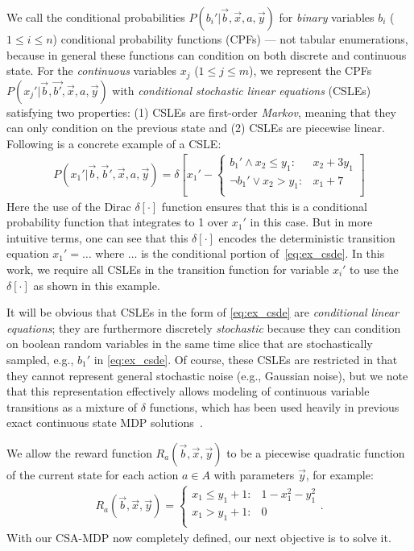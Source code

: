 \documentclass[letterpaper]{article}
\begin{document}
We call the conditional probabilities
$P(b_i'|\vec{b},\vec{x},a,\vec{y})$ for \emph{binary} variables $b_i$
($1 \leq i \leq n$) conditional probability functions (CPFs) --- not
tabular enumerations, because in general these functions can condition
on both discrete and continuous state.  For the \emph{continuous}
variables $x_j$ ($1 \leq j \leq m$), we represent the CPFs
$P(x_j'|\vec{b},\vec{b'},\vec{x},a,\vec{y})$ with \emph{conditional
stochastic linear equations} (CSLEs) satisfying two properties: (1) CSLEs are
first-order \emph{Markov}, meaning that they can only condition on the previous
state and (2) CSLEs are piecewise linear.  Following is 
a concrete example of a CSLE:
{\footnotesize
\begin{align}
P(x_1' | \vec{b},\vec{b}',\vec{x},a,\vec{y}) = \delta\left[ x_1' - 
\begin{cases}
b_1' \land x_2 \leq y_1  : & x_2 + 3y_1 \\
\neg b_1' \lor x_2 > y_1 : & x_1 + 7\\
\end{cases}
\right] \label{eq:ex_csde}
\end{align}}
Here 
the use of the Dirac $\delta[\cdot]$ function ensures that this is a
conditional probability function that integrates to 1 over $x_1'$
in this case.  But in more intuitive terms, one can see that this
$\delta[\cdot]$ encodes the deterministic transition 
equation $x_1' = \ldots$ where $\ldots$ is the conditional portion 
of~\eqref{eq:ex_csde}.
In this work, we require all CSLEs in the transition
function for variable $x_i'$ to use the $\delta[\cdot]$ as shown in this
example.

It will be obvious that CSLEs in the form of \eqref{eq:ex_csde} are
\emph{conditional linear equations}; they are furthermore discretely 
\emph{stochastic}
because they can condition on boolean random variables in the same time slice
that are stochastically sampled, e.g., $b_1'$ in
\eqref{eq:ex_csde}.  Of course, these CSLEs are restricted in that
they cannot represent general stochastic noise (e.g., Gaussian noise),
but we note that this representation effectively allows modeling of
continuous variable transitions as a mixture of $\delta$ functions,
which has been used heavily in previous exact continuous state MDP 
solutions~\cite{feng04,li05,hao09}.  

We allow the reward function $R_a(\vec{b},\vec{x},\vec{y})$ to be a
piecewise quadratic function of the current state for each action $a
\in A$ with parameters $\vec{y}$, for example:
\begin{align}
R_a(\vec{b},\vec{x},\vec{y}) = \begin{cases}
x_1 \leq y_1 + 1 : & 1 - x_1^2 - y_1^2  \\
x_1 > y_1 + 1:     & 0 \\
\end{cases}. \label{eq:simple_reward}
\end{align}
With our CSA-MDP now completely defined, our next objective
is to solve it.
\end{document}
